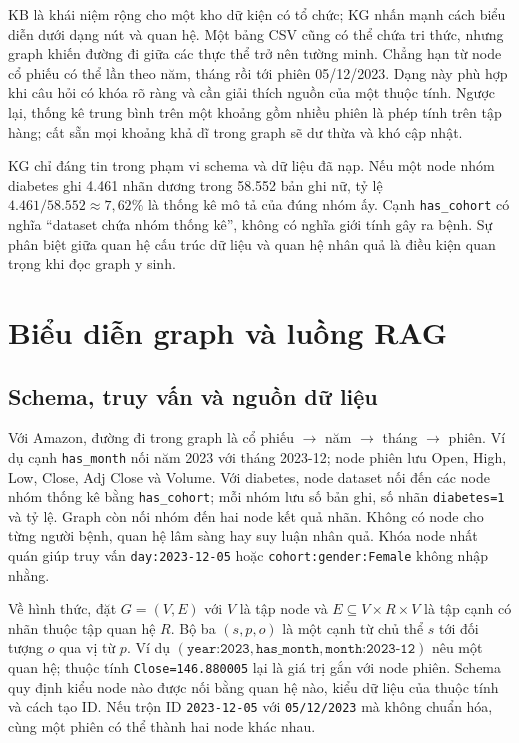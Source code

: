\documentclass[12pt,a4paper]{report}
\begin{document}
KB là khái niệm rộng cho một kho dữ kiện có tổ chức; KG nhấn mạnh cách biểu diễn dưới dạng nút và quan hệ. Một bảng CSV cũng có thể chứa tri thức, nhưng graph khiến đường đi giữa các thực thể trở nên tường minh. Chẳng hạn từ node cổ phiếu có thể lần theo năm, tháng rồi tới phiên 05/12/2023. Dạng này phù hợp khi câu hỏi có khóa rõ ràng và cần giải thích nguồn của một thuộc tính. Ngược lại, thống kê trung bình trên một khoảng gồm nhiều phiên là phép tính trên tập hàng; cất sẵn mọi khoảng khả dĩ trong graph sẽ dư thừa và khó cập nhật.

KG chỉ đáng tin trong phạm vi schema và dữ liệu đã nạp. Nếu một node nhóm diabetes ghi 4.461 nhãn dương trong 58.552 bản ghi nữ, tỷ lệ $4.461/58.552\approx7{,}62\%$ là thống kê mô tả của đúng nhóm ấy. Cạnh \texttt{has\_cohort} có nghĩa ``dataset chứa nhóm thống kê'', không có nghĩa giới tính gây ra bệnh. Sự phân biệt giữa quan hệ cấu trúc dữ liệu và quan hệ nhân quả là điều kiện quan trọng khi đọc graph y sinh.

\section{Biểu diễn graph và luồng RAG}
\subsection{Schema, truy vấn và nguồn dữ liệu}
Với Amazon, đường đi trong graph là cổ phiếu $\rightarrow$ năm $\rightarrow$ tháng
$\rightarrow$ phiên. Ví dụ cạnh \texttt{has\_month} nối năm 2023 với tháng 2023-12;
node phiên lưu Open, High, Low, Close, Adj Close và Volume. Với diabetes, node dataset nối đến
các node nhóm thống kê bằng \texttt{has\_cohort}; mỗi nhóm lưu số bản ghi, số nhãn
\texttt{diabetes=1} và tỷ lệ. Graph còn nối nhóm đến hai node kết quả nhãn. Không có node cho
từng người bệnh, quan hệ lâm sàng hay suy luận nhân quả. Khóa node nhất quán giúp truy vấn
\texttt{day:2023-12-05} hoặc \texttt{cohort:gender:Female} không nhập nhằng.

Về hình thức, đặt $G=(V,E)$ với $V$ là tập node và $E\subseteq V\times R\times V$ là tập cạnh có nhãn thuộc tập quan hệ $R$. Bộ ba $(s,p,o)$ là một cạnh từ chủ thể $s$ tới đối tượng $o$ qua vị từ $p$. Ví dụ $(\texttt{year:2023},\texttt{has\_month},\texttt{month:2023-12})$ nêu một quan hệ; thuộc tính \texttt{Close=146.880005} lại là giá trị gắn với node phiên. Schema quy định kiểu node nào được nối bằng quan hệ nào, kiểu dữ liệu của thuộc tính và cách tạo ID. Nếu trộn ID \texttt{2023-12-05} với \texttt{05/12/2023} mà không chuẩn hóa, cùng một phiên có thể thành hai node khác nhau.
\end{document}
